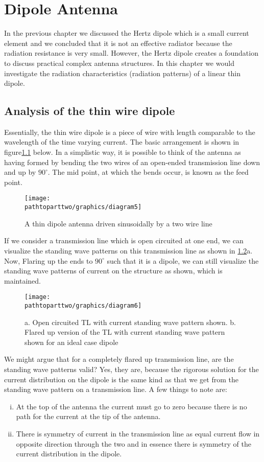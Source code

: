 \chapter{Dipole Antenna}
In the previous chapter we discussed the Hertz dipole which is a small current element and we concluded that it is not an effective radiator because the radiation resistance is very small. However, the Hertz dipole creates a foundation to discuss practical complex antenna structures. In this chapter we would investigate the radiation characteristics (radiation patterns) of a linear thin dipole. 

\section{Analysis of the thin wire dipole}
Essentially, the thin wire dipole is a piece of wire with length comparable to the wavelength of the time varying current. The basic arrangement is shown in figure\ref{figure1} below. In a simplistic way, it is possible to think of the antenna as having formed by bending the two wires of an open-ended transmission line down and up by $90^\circ$. The mid point, at which the bends occur, is known as the feed point. 
\begin{figure}[h]
\centering
\texttt{[image: \\pathtoparttwo/graphics/diagram5]}
\caption{A thin dipole antenna driven sinusoidally by a two wire line}
\label{figure1}
\end{figure}

If we consider a transmission line which is open circuited at one end, we can visualize the standing wave patterns on this transmission line as shown in \ref{figure2}a. Now, Flaring up the ends to $90^\circ$ such that it is a dipole, we can still visualize the standing wave patterns of current on the structure as shown, which is maintained. 
\begin{figure}[h]
\centering
\texttt{[image: \\pathtoparttwo/graphics/diagram6]}
\caption{a. Open circuited TL with current standing wave pattern shown.           
 b. Flared up version of the TL with current standing wave pattern shown for an ideal case dipole}
\label{figure2}
\end{figure}

We might argue that for a completely flared up transmission line, are the standing wave patterns valid? Yes, they are, because the rigorous solution for the current distribution on the dipole is the same kind as that we get from the standing wave pattern on a transmission line. A few things to note are:
\begin{enumerate}[(i)]
\item  At the top of the antenna the current must go to zero because there is no path for the current at the tip of the antenna.
\item  There is symmetry of current in the transmission line as equal current flow in opposite direction through the two and in essence there is symmetry of the current distribution in the dipole. 
\end{enumerate}

